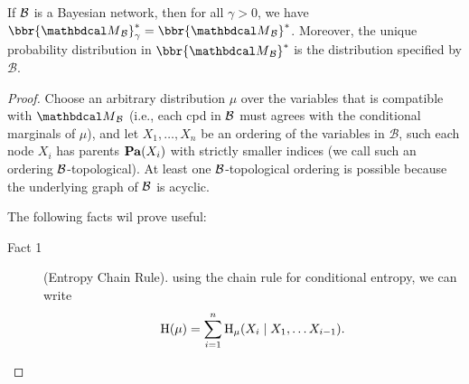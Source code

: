 {}
	  If $\cal B$ is a Bayesian network, then
for all $\gamma > 0$,
we have $\bbr{\PDGof{{\mathcal B}}}_\gamma^* =
\bbr{\PDGof{{\mathcal B}}}^*$.  Moreover, the unique probability distribution in
$\bbr{\PDGof{{\mathcal B}}}^*$ is the distribution specified by
		${\mathcal B}$.
\eothm
\begin{proof}%
	  Choose an arbitrary distribution $\mu$ over the
			variables that is 
	  compatible with $\PDGof{\cal B}$ (i.e.,
			each cpd in $\cal B$ must agrees with the
			conditional marginals of $\mu$), and let $X_1, \ldots,
			X_n$ be an ordering of the variables in $\mathcal B$,
			such each node $X_i$ has parents $\mathbf{Pa}(X_i)$ with
			strictly smaller indices (we call such an ordering
			$\cal B$-topological). At least one $\cal
			B$-topological ordering is possible because the
			underlying graph of $\cal B$ is acyclic.  
	
			The following facts wil prove useful:
	\begin{description}
		\item[Fact 1] (Entropy Chain Rule). using the chain rule for conditional entropy, we can write 
		\[ \operatorname{\mathrm{H}}(\mu) = \sum_{i = 1}^n \operatorname{\mathrm{H}}_\mu(X_i \mid X_1, \ldots X_{i-1}). \]



\end{description}
\end{proof}
